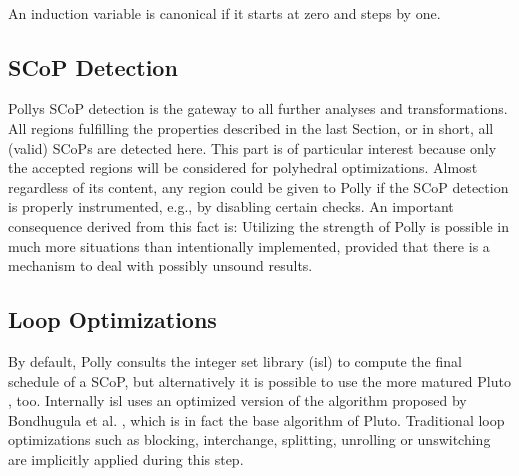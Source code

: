 \begin{definition} ~\\
  An induction variable is canonical if it starts at zero and steps by one.
  \label{def:CanonicalInductionVariable}
\end{definition}

\subsection{SCoP Detection}
Pollys SCoP detection is the gateway to all further analyses and 
transformations. All regions fulfilling the properties described in the 
last Section, or in short, all (valid) SCoPs are detected here. 
This part is of particular interest because only the accepted regions
will be considered for polyhedral optimizations. 
Almost regardless of its content, any region could be given to
Polly if the SCoP detection is properly instrumented, e.g., by disabling certain 
checks. An important consequence derived from this fact is:
Utilizing the strength of Polly is possible in much more situations than
intentionally implemented, provided that there is a mechanism to deal with 
possibly unsound results.


\subsection{Loop Optimizations}
By default, Polly consults the integer set library (isl) to compute the
final schedule of a SCoP, but alternatively it is possible to use the more 
matured Pluto \cite{Bondhugula07pluto:a}, too. 
Internally isl uses an optimized version of the algorithm 
proposed by Bondhugula et al. \cite{Bondhugula:2008:PAP:1379022.1375595}, which 
is in fact the base algorithm of Pluto. 
Traditional loop optimizations such as blocking, interchange, splitting,
unrolling or unswitching are implicitly applied during this step. 




